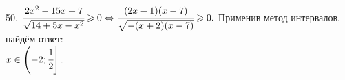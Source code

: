 50. $\cfrac{2x^2-15x+7}{\sqrt{14+5x-x^2}}\geqslant0\Leftrightarrow\cfrac{(2x-1)(x-7)}{\sqrt{-(x+2)(x-7)}}\geqslant0.$ Применив метод интервалов, найдём ответ:\\ $x\in\left(-2;\cfrac{1}{2}\right].$
\begin{figure}[ht!]
\end{figure}\\
